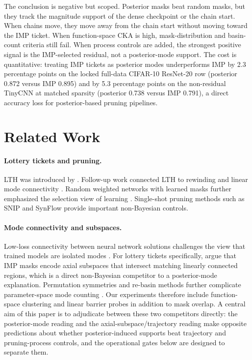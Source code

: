 \documentclass{article}
\begin{document}
The conclusion is negative but scoped. Posterior masks beat random masks, but
they track the magnitude support of the dense checkpoint or the chain start.
When chains move, they move away from the chain start without moving toward the
IMP ticket. When function-space CKA is high, mask-distribution and basin-count
criteria still fail. When process controls are added, the strongest positive
signal is the IMP-selected residual, not a posterior-mode support. The cost is
quantitative: treating IMP tickets as posterior modes underperforms IMP by 2.3
percentage points on the locked full-data CIFAR-10 ResNet-20 row (posterior
0.872 versus IMP 0.895) and by 5.3 percentage points on the non-residual
TinyCNN at matched sparsity (posterior 0.738 versus IMP 0.791), a direct
accuracy loss for posterior-based pruning pipelines.

\section{Related Work}
\label{sec:related}

\paragraph{Lottery tickets and pruning.}
LTH was introduced by \citet{frankle2019lottery}. Follow-up work connected LTH
to rewinding and linear mode connectivity \citep{frankle2020linear}. Random
weighted networks with learned masks further emphasized the selection view of
learning \citep{ramanujan2020hidden}. Single-shot pruning methods such as SNIP
\citep{lee2019snip} and SynFlow \citep{tanaka2020synflow} provide important
non-Bayesian controls.

\paragraph{Mode connectivity and subspaces.}
Low-loss connectivity between neural network solutions challenges the view that
trained models are isolated modes \citep{garipov2018loss, draxler2018barriers}.
For lottery tickets specifically, \citet{paul2023unmasking} argue that IMP
masks encode axial subspaces that intersect matching linearly connected regions,
which is a direct non-Bayesian competitor to a posterior-mode explanation.
Permutation symmetries and re-basin methods further complicate parameter-space
mode counting \citep{entezari2022role, ainsworth2023git}. Our experiments
therefore include function-space clustering and linear barrier probes in
addition to mask overlap. A central aim of this paper is to adjudicate between
these two competitors directly: the posterior-mode reading and the
axial-subspace/trajectory reading make opposite predictions about whether
posterior-induced supports beat trajectory and pruning-process controls, and
the operational gates below are designed to separate them.
\end{document}
